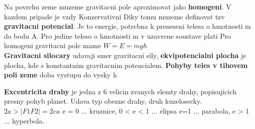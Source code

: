 \documentclass{report}
\newcommand*\diff{\mathop{}\!\mathrm{d}}
\begin{document}
Na povrchu zeme muzeme gravitacni pole aproximovat jako \textbf{homogeni}. V kazdem pripade je vzdy Konzervativni
Diky tomu muzeme definovat tzv \textbf{gravitacni potencial}. Je to energie, potrebna k preneseni telesa o hmotnosti m do bodu A. Pro jedine teleso o hmotnosti m v uzavrene soustave plati
\frm{$\phi=\int_{\infty}^{R}G\frac{m}{r^2} \diff r = -G\frac{m}{R}-(-G\frac{m}{\infty})=-G\frac{m}{R}\\[5pt]
2C=0$}
Pro homogeni gravitacni pole mame $W=E=mgh$ \\
\textbf{Gravitacni silocary} udavaji smer gravitacni sily, \textbf{ekvipotencialni plocha} je plocha, kde s konstantnim gravitacnim potencialem.
\textbf{Pohyby teles v tihovem poli zeme}
doba vystupu do vysky h

\textbf{Excentricita drahy} je jedna z 6 velicin zvanych elemty drahy, popisujicich presny pohyb planet. Udava typ obezne drahy, druh kuzelosecky. $2a > |F1F2|= 2ea$ e = 0 ... kruznice, 0 < e < 1 ... elipsa e=1 ... parabola, e > 1 ... hyperbola. \\
\end{document}
